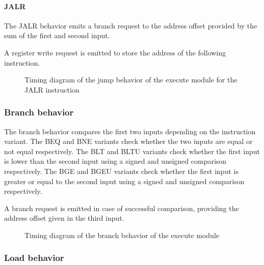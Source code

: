       \paragraph{JALR}

      \begin{content}
          The JALR behavior emits a branch request to the address offset provided by the sum of the first and second input.
          
          A register write request is emitted to store the address of the following instruction.
        \end{content}

      \begin{figure}[H]
          \centering
          
          \caption{Timing diagram of the jump behavior of the execute module for the JALR instruction}
          \label{fig:exm-behavior-jump-jalr}
        \end{figure}

    \subsubsection{Branch behavior}

      \begin{content}
          The branch behavior compares the first two inputs depending on the instruction variant. The BEQ and BNE variants check whether the two inputs are equal or not equal respectively. The BLT and BLTU variants check whether the first input is lower than the second input using a signed and unsigned comparison respectively. The BGE and BGEU variants check whether the first input is greater or equal to the second input using a signed and unsigned comparison respectively.
          
          A branch request is emitted in case of successful comparison, providing the address offset given in the third input.
        \end{content}

      \begin{figure}[H]
          \centering
          
          \caption{Timing diagram of the branch behavior of the execute module}
          \label{fig:exm-behavior-branch}
        \end{figure}

      

    \subsubsection{Load behavior}

